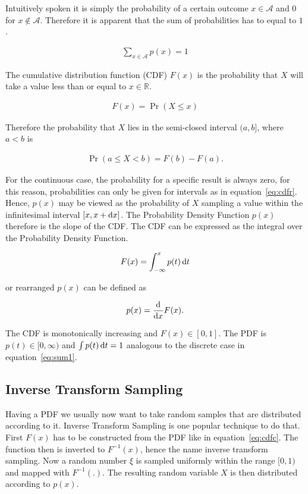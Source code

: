 Intuitively spoken it is simply the probability of a certain outcome $x \in \mathcal{A}$ and $0$ for $x \notin \mathcal{A}$. Therefore it is apparent that the sum of probabilities has to equal to $1$.

\begin{align}
\label{eq:sum1}
\sum_{x\in\mathcal{A}}p(x) = 1
\end{align}

The cumulative distribution function (CDF) $F(x)$ is the probability that $X$ will take a value less than or equal to $x \in \mathbb{R}$.

\begin{align}
 F(x) = \Pr(X \leq x)
\end{align}

Therefore the probability that $X$ lies in the semi-closed interval $(a, b]$, where $a < b$ is  

\begin{align}
\label{eq:cdfr}
 \Pr(a \leq X < b) = F(b) - F(a).
\end{align}

For the continuous case, the probability for a specific result is always zero, for this reason, probabilities can only be given for intervals as in equation~\ref{eq:cdfr}. Hence, $p(x)$ may be viewed as the probability of $X$ sampling a value within the infinitesimal interval $[x, x + \mathop{}\!\mathrm{d} x]$. The Probability Density Function $p(x)$ therefore is the slope of the CDF. The CDF can be expressed as the integral over the Probability Density Function.

\begin{align}
\label{eq:cdfc}
 F(x) = \int_{-\infty}^{x}p(t)\mathop{}\!\mathrm{d} t
\end{align}

or rearranged $p(x)$ can be defined as

\begin{align}
 p(x) = \frac{\mathop{}\!\mathrm{d}}{\mathop{}\!\mathrm{d} x} F(x).
\end{align}

The CDF is monotonically increasing and $F(x) \in [0,1]$. The PDF is $p(t) \in [0, \infty)$ and $\int p(t)\mathop{}\!\mathrm{d} t = 1$ analogous to the discrete case in equation~\ref{eq:sum1}. 

\subsection{Inverse Transform Sampling}

Having a PDF we usually now want to take random samples that are distributed according to it. Inverse Transform Sampling is one popular technique to do that. First $F(x)$ has to be constructed from the PDF like in equation~\ref{eq:cdfc}. The function then is inverted to $F^{-1}(x)$, hence the name inverse transform sampling. Now a random number $\xi$ is sampled uniformly within the range $[0, 1)$ and mapped with $F^{-1}(.)$. The resulting random variable $X$ is then distributed according to $p(x)$.

